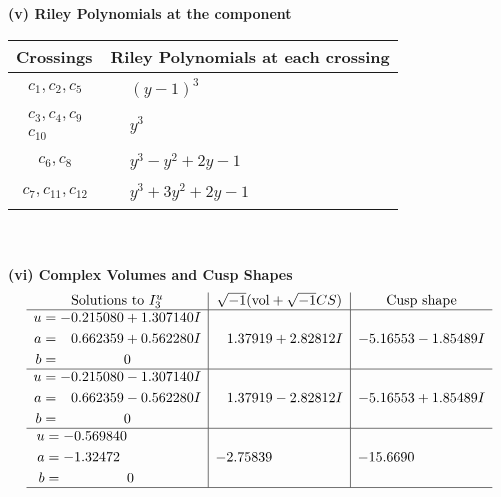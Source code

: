 \documentclass[1p]{elsarticle_modified}
\theoremstyle{definition}
\newcommand{\I}{\sqrt{-1}}
\begin{document}
\newpage\renewcommand{\arraystretch}{1}
\flushleft \textbf{(v) Riley Polynomials at the component}\newline \\
\begin{tabular}{m{50pt}|m{274pt}}
Crossings & \hspace{64pt}Riley Polynomials at each crossing \\
\hline $$\begin{aligned}c_{1},c_{2},c_{5}\end{aligned}$$&$\begin{aligned}
&(y-1)^3
\end{aligned}$\\
\hline $$\begin{aligned}c_{3},c_{4},c_{9}\\c_{10}\end{aligned}$$&$\begin{aligned}
&y^3
\end{aligned}$\\
\hline $$\begin{aligned}c_{6},c_{8}\end{aligned}$$&$\begin{aligned}
&y^3- y^2+2 y-1
\end{aligned}$\\
\hline $$\begin{aligned}c_{7},c_{11},c_{12}\end{aligned}$$&$\begin{aligned}
&y^3+3 y^2+2 y-1
\end{aligned}$\\
\hline
\end{tabular}\\~\\
\newpage\flushleft \textbf{(vi) Complex Volumes and Cusp Shapes}
$$\begin{array}{c|c|c}  
\text{Solutions to }I^u_{3}& \I (\text{vol} + \sqrt{-1}CS) & \text{Cusp shape}\\
 \hline 
\begin{aligned}
u &= -0.215080 + 1.307140 I \\
a &= \phantom{-}0.662359 + 0.562280 I \\
b &= \phantom{-0.000000 } 0\end{aligned}
 & \phantom{-}1.37919 + 2.82812 I & -5.16553 - 1.85489 I \\ \hline\begin{aligned}
u &= -0.215080 - 1.307140 I \\
a &= \phantom{-}0.662359 - 0.562280 I \\
b &= \phantom{-0.000000 } 0\end{aligned}
 & \phantom{-}1.37919 - 2.82812 I & -5.16553 + 1.85489 I \\ \hline\begin{aligned}
u &= -0.569840\phantom{ +0.000000I} \\
a &= -1.32472\phantom{ +0.000000I} \\
b &= \phantom{-0.000000 } 0\end{aligned}
 & -2.75839\phantom{ +0.000000I} & -15.6690\phantom{ +0.000000I}\\
 \hline 
 \end{array}$$\newpage
\end{document}
